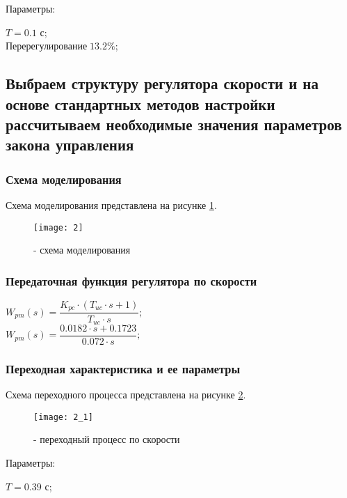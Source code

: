 Параметры:
\begin{center}
	$T = 0.1 \text{ с}$;\\
	$\text{Перерегулирование} \; 13.2\%$;\\
\end{center}

\subsection{Выбраем структуру регулятора скорости и на основе стандартных методов настройки рассчитываем необходимые значения параметров закона управления}

\subsubsection{Схема моделирования}
Схема моделирования представлена на рисунке \ref{pic:pic_3}.
\begin{figure}[H]
	\begin{center}
		\texttt{[image: 2]}
		\caption{- схема моделирования} 
		\label{pic:pic_3} %
	\end{center}
\end{figure}

\subsubsection{Передаточная функция регулятора по скорости}
\begin{center}
	$W_{pm}(s)=\dfrac{K_{pc}\cdot(T_{uc}\cdot s+1)}{T_{uc}\cdot s};$\\
	$W_{pm}(s)=\dfrac{0.0182\cdot s+0.1723}{0.072\cdot s};$\\
\end{center}


\subsubsection{Переходная характеристика и ее параметры}
Схема переходного процесса представлена на рисунке \ref{pic:pic_4}.
\begin{figure}[H]
	\begin{center}
		\texttt{[image: 2\_1]}
		\caption{- переходный процесс по скорости} 
		\label{pic:pic_4} %
	\end{center}
\end{figure}

Параметры:
\begin{center}
	$T = 0.39 \text{ с}$;\\
\end{center}


